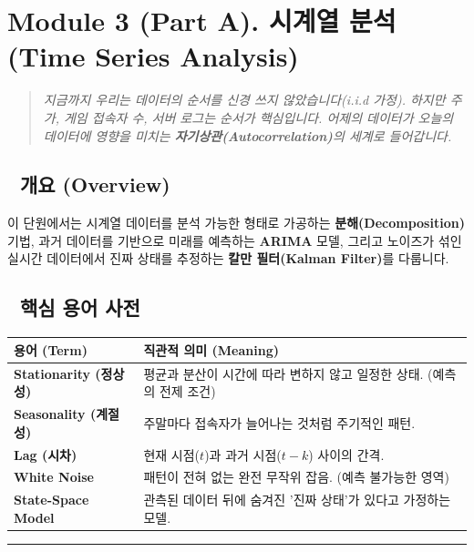 \documentclass[11pt,a4paper]{book}
\theoremstyle{definition}
\begin{document}
\section{Module 3 (Part A). 시계열 분석 (Time Series Analysis)}

\begin{quote}
\textit{지금까지 우리는 데이터의 순서를 신경 쓰지 않았습니다(i.i.d 가정). 하지만 주가, 게임 접속자 수, 서버 로그는 순서가 핵심입니다. 어제의 데이터가 오늘의 데이터에 영향을 미치는 \textbf{자기상관(Autocorrelation)}의 세계로 들어갑니다.}
\end{quote}

\subsection*{📌 개요 (Overview)}
이 단원에서는 시계열 데이터를 분석 가능한 형태로 가공하는 \textbf{분해(Decomposition)} 기법, 과거 데이터를 기반으로 미래를 예측하는 \textbf{ARIMA} 모델, 그리고 노이즈가 섞인 실시간 데이터에서 진짜 상태를 추정하는 \textbf{칼만 필터(Kalman Filter)}를 다룹니다.

\subsection*{📝 핵심 용어 사전}
\begin{table}[h]
\centering
\begin{tabularx}{\textwidth}{|p{}|X|}
\hline
\textbf{용어 (Term)} & \textbf{직관적 의미 (Meaning)} \\
\hline
\textbf{Stationarity (정상성)} & 평균과 분산이 시간에 따라 변하지 않고 일정한 상태. (예측의 전제 조건) \\
\hline
\textbf{Seasonality (계절성)} & 주말마다 접속자가 늘어나는 것처럼 주기적인 패턴. \\
\hline
\textbf{Lag (시차)} & 현재 시점($t$)과 과거 시점($t-k$) 사이의 간격. \\
\hline
\textbf{White Noise} & 패턴이 전혀 없는 완전 무작위 잡음. (예측 불가능한 영역) \\
\hline
\textbf{State-Space Model} & 관측된 데이터 뒤에 숨겨진 '진짜 상태'가 있다고 가정하는 모델. \\
\hline
\end{tabularx}
\end{table}

\vspace{0.5cm}\hrule\vspace{0.5cm}
\end{document}
